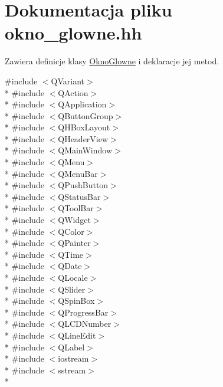 \hypertarget{okno__glowne_8hh}{\section{Dokumentacja pliku okno\-\_\-glowne.\-hh}
\label{okno__glowne_8hh}
}


Zawiera definicje klasy \hyperlink{class_okno_glowne}{Okno\-Glowne} i deklaracje jej metod.  


{\ttfamily \#include $<$Q\-Variant$>$}\\*
{\ttfamily \#include $<$Q\-Action$>$}\\*
{\ttfamily \#include $<$Q\-Application$>$}\\*
{\ttfamily \#include $<$Q\-Button\-Group$>$}\\*
{\ttfamily \#include $<$Q\-H\-Box\-Layout$>$}\\*
{\ttfamily \#include $<$Q\-Header\-View$>$}\\*
{\ttfamily \#include $<$Q\-Main\-Window$>$}\\*
{\ttfamily \#include $<$Q\-Menu$>$}\\*
{\ttfamily \#include $<$Q\-Menu\-Bar$>$}\\*
{\ttfamily \#include $<$Q\-Push\-Button$>$}\\*
{\ttfamily \#include $<$Q\-Status\-Bar$>$}\\*
{\ttfamily \#include $<$Q\-Tool\-Bar$>$}\\*
{\ttfamily \#include $<$Q\-Widget$>$}\\*
{\ttfamily \#include $<$Q\-Color$>$}\\*
{\ttfamily \#include $<$Q\-Painter$>$}\\*
{\ttfamily \#include $<$Q\-Time$>$}\\*
{\ttfamily \#include $<$Q\-Date$>$}\\*
{\ttfamily \#include $<$Q\-Locale$>$}\\*
{\ttfamily \#include $<$Q\-Slider$>$}\\*
{\ttfamily \#include $<$Q\-Spin\-Box$>$}\\*
{\ttfamily \#include $<$Q\-Progress\-Bar$>$}\\*
{\ttfamily \#include $<$Q\-L\-C\-D\-Number$>$}\\*
{\ttfamily \#include $<$Q\-Line\-Edit$>$}\\*
{\ttfamily \#include $<$Q\-Label$>$}\\*
{\ttfamily \#include $<$iostream$>$}\\*
{\ttfamily \#include $<$sstream$>$}\\*
